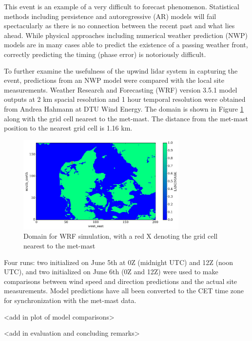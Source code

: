 This event is an example of a very difficult to forecast phenomenon. Statistical methods including persistence and autoregressive (AR) models will fail spectacularly as there is no connection between the recent past and what lies ahead. While physical approaches including numerical weather prediction (NWP) models are in many cases able to predict the existence of a passing weather front, correctly predicting the timing (phase error) is notoriously difficult.

To further examine the usefulness of the upwind lidar system in capturing the event, predictions from an NWP model were compared with the local site measurements. 
Weather Research and Forecasting (WRF) version 3.5.1 model outputs at 2 km spacial resolution and 1 hour temporal resolution were obtained from Andrea Hahmann at DTU Wind Energy. The domain is shown in Figure \ref{fig:wrf_grid_annotated} along with the grid cell nearest to the met-mast. The distance from the met-mast position to the nearest grid cell is 1.16 km.

\begin{figure}[htbp]
    \centering
        \includegraphics[width=0.75\textwidth]{graphics/results/balcony-addendum/wrf_grid_annotated.png}
    \caption{Domain for WRF simulation, with a red X denoting the grid cell nearest to the met-mast}
    \label{fig:wrf_grid_annotated}
\end{figure}

Four runs: two initialized on June 5th at 0Z (midnight UTC) and 12Z (noon UTC), and two initialized on June 6th (0Z and 12Z) were used to make comparisons between wind speed and direction predictions and the actual site measurements. Model predictions have all been converted to the CET time zone for synchronization with the met-mast data.

<add in plot of model comparisons>

<add in evaluation and concluding remarks>














